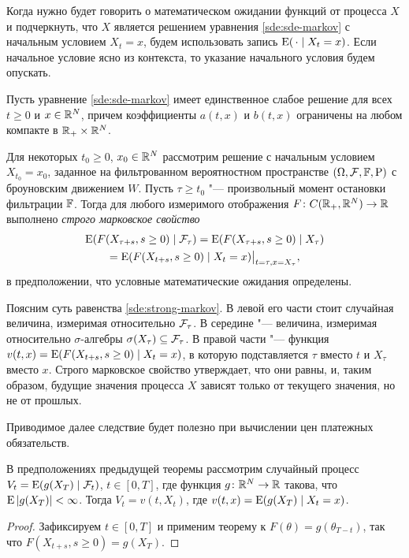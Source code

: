 Когда нужно будет говорить о математическом ожидании функций от процесса $X$ и подчеркнуть, что $X$ является решением уравнения \eqref{sde:sde-markov} с начальным условием $X_t=x$, будем использовать запись $\operatorname{E}(\,\cdot\mid X_t=x)$.
Если начальное условие ясно из контекста, то указание начального условия будем опускать.

\begin{theorem}
\label{sde:t:strong-markov}
Пусть уравнение \eqref{sde:sde-markov} имеет единственное слабое решение для всех $t\ge0$ и $x\in \mathbb{R}^N$, причем коэффициенты $a(t,x)$ и $b(t,x)$ ограничены на любом компакте в $\mathbb{R}_+\times\mathbb{R}^N$.

Для некоторых $t_0\ge0$, $x_0\in\mathbb{R}^N$ рассмотрим решение с начальным условием $X_{t_0}=x_0$, заданное на фильтрованном вероятностном пространстве $(\Omega,\mathcal{F},\mathbb{F},\mathrm{P})$ с броуновским движением $W$.
Пусть $\tau\ge t_0$ "--- произвольный момент остановки фильтрации $\mathbb{F}$.
Тогда для любого измеримого отображения $F\colon C(\mathbb{R}_+,\mathbb{R}^N) \to \mathbb{R}$ выполнено \emph{строго марковское свойство}%
\begin{multline}
\label{sde:strong-markov}
\operatorname{E} (F(X_{\tau + s}, s\ge 0) \mid \mathcal{F}_\tau) = \operatorname{E} (F(X_{\tau + s}, s\ge 0) \mid X_\tau) \\
= \operatorname{E}(F(X_{t+s}, s\ge 0) \mid X_t=x) \big|_{t=\tau,x=X_\tau},
\end{multline}
в предположении, что условные математические ожидания определены.
\end{theorem}

Поясним суть равенства \eqref{sde:strong-markov}.
В левой его части стоит случайная величина, измеримая относительно $\mathcal{F}_\tau$.
В середине "--- величина, измеримая относительно $\sigma$-алгебры $\sigma(X_\tau)\subseteq \mathcal{F}_\tau$.
В правой части "--- функция $v(t,x) = \operatorname{E}(F(X_{t+s}, s\ge 0) \mid X_t=x)$, в которую подставляется $\tau$ вместо $t$ и $X_\tau$ вместо $x$.
Строго марковское свойство утверждает, что они равны, и, таким образом, будущие значения процесса $X$ зависят только от текущего значения, но не от прошлых.

\medskip
Приводимое далее следствие будет полезно при вычислении цен платежных обязательств.

\begin{corollary}
В предположениях предыдущей теоремы рассмотрим случайный процесс $V_t = \operatorname{E}(g(X_T) \mid \mathcal{F}_t)$, $t\in[0,T]$, где функция $g\colon\mathbb{R}^N\to\mathbb{R}$ такова, что $\operatorname{E} |g(X_T)| < \infty$.
Тогда $V_t = v(t,X_t)$, где $v(t,x) = \operatorname{E}(g(X_T) \mid X_t=x)$.
\end{corollary}
\begin{proof}
Зафиксируем $t\in[0,T]$ и применим теорему к $F(\theta) = g(\theta_{T-t})$, так что $F(X_{t+s}, s\ge 0) = g(X_T)$.
\end{proof}


